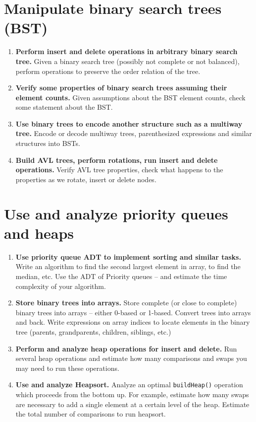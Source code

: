 \documentclass[a4paper,12pt]{article}
\begin{document}
\section{Manipulate binary search trees (BST)}

\begin{enumerate}[label=3.\Alph*.]
\item {\bf Perform insert and delete operations in arbitrary binary search tree.}
Given a binary search tree (possibly not complete or not balanced), 
perform operations to preserve the order relation of the tree.
\item {\bf Verify some properties of binary search trees assuming their element counts.}
Given assumptions about the BST element counts, check some statement about the BST.
\item {\bf Use binary trees to encode another structure such as a multiway tree.}
Encode or decode multiway trees, parenthesized expressions and similar structures into BSTs.
\item {\bf Build AVL trees, perform rotations, run insert and delete operations.}
Verify AVL tree properties, check what happens to the properties as we rotate, insert or delete nodes.
\end{enumerate}


\section{Use and analyze priority queues and heaps}

\begin{enumerate}[label=4.\Alph*.]
\item {\bf Use priority queue ADT to implement sorting and similar tasks.}
Write an algorithm to find the second largest
element in array, to find the median, etc. Use the ADT of Priority queues -- and estimate
the time complexity of your algorithm. 
\item {\bf Store binary trees into arrays.}
Store complete (or close to complete) binary trees into arrays -- either 0-based or 1-based. 
Convert trees into arrays and back. Write expressions on array indices to locate
elements in the binary tree (parents, grandparents, children, siblings, etc.)
\item {\bf Perform and analyze heap operations for insert and delete.}
Run several heap operations and estimate how many comparisons and swaps you may need to 
run these operations.
\item {\bf Use and analyze Heapsort.} 
Analyze an optimal {\tt buildHeap()} operation which proceeds from the bottom up. 
For example, estimate how many swaps are necessary 
to add a single element at a certain level of the heap. 
Estimate the total number of comparisons to run heapsort. 
\end{enumerate}
\end{document}
